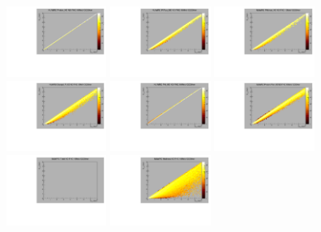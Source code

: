 \begin{center}

  \includegraphics[width=0.245\textwidth]{plots/response_matrix/Proton_KE_FHC_CCOther_10MeV.pdf}
  \includegraphics[width=0.245\textwidth]{plots/response_matrix/PiPlus_KE_FHC_CCOther_10MeV.pdf}
  \includegraphics[width=0.245\textwidth]{plots/response_matrix/PiMinus_KE_FHC_CCOther_10MeV.pdf}
  \includegraphics[width=0.245\textwidth]{plots/response_matrix/Charged_Pi_KE_FHC_CCOther_10MeV.pdf}
  \includegraphics[width=0.245\textwidth]{plots/response_matrix/Pi0_KE_FHC_CCOther_10MeV.pdf}
  \includegraphics[width=0.245\textwidth]{plots/response_matrix/Proton+Pion_KE_FHC_CCOther_10MeV.pdf}
  \includegraphics[width=0.245\textwidth]{plots/response_matrix/Total_FHC_CCOther_10MeV.pdf}
  \includegraphics[width=0.245\textwidth]{plots/response_matrix/Hadrons_FHC_CCOther_10MeV.pdf}

\end{center}

